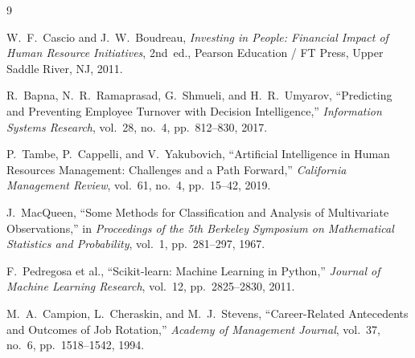 \documentclass[12pt,a4paper,oneside]{article}
\begin{document}
\begin{thebibliography}{9}

W.~F.~Cascio and J.~W.~Boudreau, \textit{Investing in People: Financial Impact of Human Resource Initiatives}, 2nd~ed., Pearson Education / FT Press, Upper Saddle River, NJ, 2011.

R.~Bapna, N.~R.~Ramaprasad, G.~Shmueli, and H.~R.~Umyarov, ``Predicting and Preventing Employee Turnover with Decision Intelligence,'' \textit{Information Systems Research}, vol.~28, no.~4, pp.~812--830, 2017.

P.~Tambe, P.~Cappelli, and V.~Yakubovich, ``Artificial Intelligence in Human Resources Management: Challenges and a Path Forward,'' \textit{California Management Review}, vol.~61, no.~4, pp.~15--42, 2019.

J.~MacQueen, ``Some Methods for Classification and Analysis of Multivariate Observations,'' in \textit{Proceedings of the 5th Berkeley Symposium on Mathematical Statistics and Probability}, vol.~1, pp.~281--297, 1967.

F.~Pedregosa et al., ``Scikit-learn: Machine Learning in Python,'' \textit{Journal of Machine Learning Research}, vol.~12, pp.~2825--2830, 2011.

M.~A.~Campion, L.~Cheraskin, and M.~J.~Stevens, ``Career-Related Antecedents and Outcomes of Job Rotation,'' \textit{Academy of Management Journal}, vol.~37, no.~6, pp.~1518--1542, 1994.

\end{thebibliography}
\end{document}
